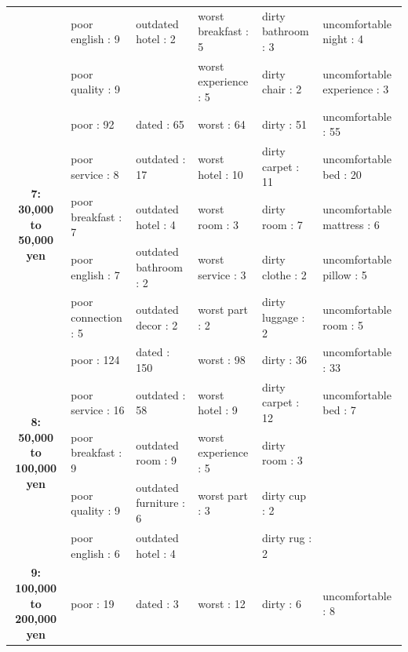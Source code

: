 \documentclass[smallextended,natbib]{svjour3}       %
\begin{document}
\begin{landscape}
\begin{table}[p]
{\begin{tabular}{|c|l|l|l|l|l|}
         &
          poor english : 9 &
          outdated hotel : 2 &
          worst breakfast : 5 &
          dirty bathroom : 3 &
          uncomfortable night : 4 \\
         &
          poor quality : 9 &
           &
          worst experience : 5 &
          dirty chair : 2 &
          uncomfortable experience : 3 \\ \hline
        \multirow{5}{*}{\textbf{7: 30,000 to 50,000 yen}} &
          poor : 92 &
          dated : 65 &
          worst : 64 &
          dirty : 51 &
          uncomfortable : 55 \\
         &
          poor service : 8 &
          outdated : 17 &
          worst hotel : 10 &
          dirty carpet : 11 &
          uncomfortable bed : 20 \\
         &
          poor breakfast : 7 &
          outdated hotel : 4 &
          worst room : 3 &
          dirty room : 7 &
          uncomfortable mattress : 6 \\
         &
          poor english : 7 &
          outdated bathroom : 2 &
          worst service : 3 &
          dirty clothe : 2 &
          uncomfortable pillow : 5 \\
         &
          poor connection : 5 &
          outdated decor : 2 &
          worst part : 2 &
          dirty luggage : 2 &
          uncomfortable room : 5 \\ \hline
        \multirow{5}{*}{\textbf{8: 50,000 to 100,000 yen}} &
          poor : 124 &
          dated : 150 &
          worst : 98 &
          dirty : 36 &
          uncomfortable : 33 \\
         &
          poor service : 16 &
          outdated : 58 &
          worst hotel : 9 &
          dirty carpet : 12 &
          uncomfortable bed : 7 \\
         &
          poor breakfast : 9 &
          outdated room : 9 &
          worst experience : 5 &
          dirty room : 3 &
           \\
         &
          poor quality : 9 &
          outdated furniture : 6 &
          worst part : 3 &
          dirty cup : 2 &
           \\
         &
          poor english : 6 &
          outdated hotel : 4 &
           &
          dirty rug : 2 &
           \\ \hline
        \multirow{5}{*}{\textbf{9: 100,000 to 200,000 yen}} &
          poor : 19 &
          dated : 3 &
          worst : 12 &
          dirty : 6 &
          uncomfortable : 8 \\

\end{tabular}}
\end{table}
\end{landscape}
\end{document}
